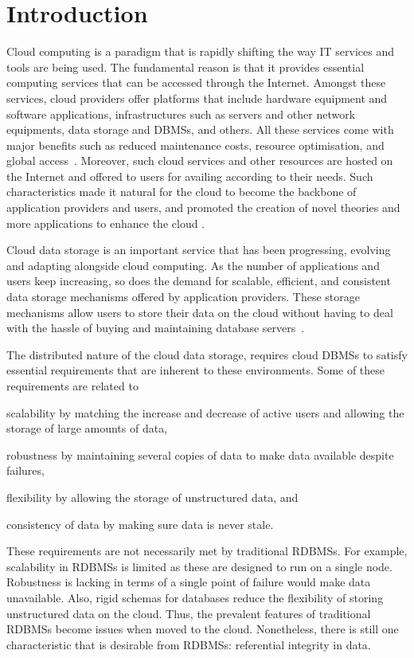 \chapter{Introduction}

% 
  
Cloud computing is a paradigm that is rapidly shifting the way IT services and
tools are being used. The fundamental reason is that it provides essential
computing services that can be accessed through the Internet. Amongst these
services, cloud providers offer platforms that include hardware equipment and
software applications, infrastructures such as servers and other  network
equipments, data storage and \acp{DBMS}, and others. All these services come
with major benefits such as reduced maintenance costs,  resource optimisation,
and global access~\citep{wilkes}. Moreover, such cloud services and other
resources are hosted on the Internet and offered to users for  availing
according to their needs.  Such characteristics made it natural for the  cloud
to become  the backbone of application providers and   users, and promoted the
creation of novel theories and more applications to enhance the cloud .
 
  
Cloud data storage is an important service that has been progressing, evolving
and adapting alongside cloud computing. As the number of applications and users
keep increasing, so does the demand for scalable, efficient, and consistent data
storage mechanisms offered by application providers. These storage mechanisms
allow  users to store their data on the cloud without
having to deal with the hassle of buying and maintaining database
servers~\citep{SNIA}.

The distributed nature of the cloud data storage, requires cloud \acp{DBMS} to
satisfy essential requirements that are inherent to these environments. Some of
these requirements are related to \begin{inparaenum}[a)] \item  scalability by
matching the increase and decrease of active users and allowing the storage of
large amounts of data, \item  robustness by maintaining several copies of data
to make data available despite failures, \item  flexibility by allowing the
storage of unstructured data, and \item  consistency of data by making sure data
is never stale.
	\end{inparaenum}	
These requirements are not necessarily met by traditional \acp{RDBMS}. For
example, scalability in \acp{RDBMS} is limited as these are designed to run on a
single node. Robustness is lacking in terms of  a single point of failure would
make data unavailable. Also,  rigid schemas for databases reduce the flexibility
of storing unstructured data on the cloud. Thus, the prevalent features of
traditional \acp{RDBMS} become issues when moved to the cloud. Nonetheless,
there is still one characteristic that is desirable from \acp{RDBMS}:
referential integrity in data.
   
